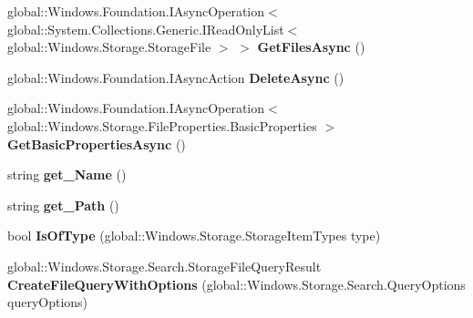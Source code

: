 \begin{DoxyCompactItemize}
\mbox{\label{class_windows_1_1_storage_1_1_storage_folder_a03d5948527bd8ff44b485ba99e4fd723}} 
global\+::\+Windows.\+Foundation.\+I\+Async\+Operation$<$ global\+::\+System.\+Collections.\+Generic.\+I\+Read\+Only\+List$<$ global\+::\+Windows.\+Storage.\+Storage\+File $>$ $>$ {\bfseries Get\+Files\+Async} ()
\item 
\mbox{\label{class_windows_1_1_storage_1_1_storage_folder_ae60237b6aa50f6820009b4332c8abd48}} 
global\+::\+Windows.\+Foundation.\+I\+Async\+Action {\bfseries Delete\+Async} ()
\item 
\mbox{\label{class_windows_1_1_storage_1_1_storage_folder_ae9c02355139ce9e4530065b3ddfb717f}} 
global\+::\+Windows.\+Foundation.\+I\+Async\+Operation$<$ global\+::\+Windows.\+Storage.\+File\+Properties.\+Basic\+Properties $>$ {\bfseries Get\+Basic\+Properties\+Async} ()
\item 
\mbox{\label{class_windows_1_1_storage_1_1_storage_folder_a722592bfe76cdbc6678e09dca477b4fc}} 
string {\bfseries get\+\_\+\+Name} ()
\item 
\mbox{\label{class_windows_1_1_storage_1_1_storage_folder_a3c76cae5d410f07ee9f03d979f1b81f8}} 
string {\bfseries get\+\_\+\+Path} ()
\item 
\mbox{\label{class_windows_1_1_storage_1_1_storage_folder_aa385666b1143c539c3b9d8bbb270e8d1}} 
bool {\bfseries Is\+Of\+Type} (global\+::\+Windows.\+Storage.\+Storage\+Item\+Types type)
\item 
\mbox{\label{class_windows_1_1_storage_1_1_storage_folder_a61bb687dd56eb8dc8b62c6d031f10c42}} 
global\+::\+Windows.\+Storage.\+Search.\+Storage\+File\+Query\+Result {\bfseries Create\+File\+Query\+With\+Options} (global\+::\+Windows.\+Storage.\+Search.\+Query\+Options query\+Options)
\item 
\mbox{\label{class_windows_1_1_storage_1_1_storage_folder_a00d4c92d7a7b2590b3bee76b0de81d34}} 

\end{DoxyCompactItemize}

